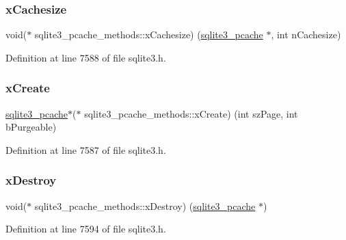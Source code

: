\subsubsection{\texorpdfstring{x\+Cachesize}{xCachesize}}
{\footnotesize\ttfamily void($\ast$ sqlite3\+\_\+pcache\+\_\+methods\+::x\+Cachesize) (\mbox{\hyperlink{sqlite3_8h_a096c453d937d51f7926d7d31c8e0bd2f}{sqlite3\+\_\+pcache}} $\ast$, int n\+Cachesize)}



Definition at line 7588 of file sqlite3.\+h.

\mbox{\label{structsqlite3__pcache__methods_ac903d0438a7a1554c818b4c17585e790}} 
\subsubsection{\texorpdfstring{x\+Create}{xCreate}}
{\footnotesize\ttfamily \mbox{\hyperlink{sqlite3_8h_a096c453d937d51f7926d7d31c8e0bd2f}{sqlite3\+\_\+pcache}}$\ast$($\ast$ sqlite3\+\_\+pcache\+\_\+methods\+::x\+Create) (int sz\+Page, int b\+Purgeable)}



Definition at line 7587 of file sqlite3.\+h.

\mbox{\label{structsqlite3__pcache__methods_ac775533f86db1d15bf7e4ded0e037eaf}} 
\subsubsection{\texorpdfstring{x\+Destroy}{xDestroy}}
{\footnotesize\ttfamily void($\ast$ sqlite3\+\_\+pcache\+\_\+methods\+::x\+Destroy) (\mbox{\hyperlink{sqlite3_8h_a096c453d937d51f7926d7d31c8e0bd2f}{sqlite3\+\_\+pcache}} $\ast$)}



Definition at line 7594 of file sqlite3.\+h.

\mbox{\label{structsqlite3__pcache__methods_ae09b8ed29c2dd77157f26a69255fd482}} 
